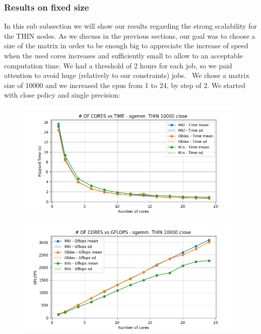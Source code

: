 \documentclass[12pt, titlepage]{report}
\begin{document}
\subsubsection{Results on fixed size}
In this sub subsection we will show our results regarding the strong scalability for the THIN nodes. As we discuss in the previous sections, our goal was to choose a size of the matrix in order to be enough big to appreciate the increase of speed when the used cores increases and sufficiently small to allow to an acceptable computation time. We had a threshold of 2 hours for each job, so we paid attention to avoid huge (relatively to our constraints) jobs. \
We chose a matrix size of 10000 and we increased the cpus from 1 to 24, by step of 2.
We started with close policy and single precision:
\begin{figure}[H]
    \centering
    \includegraphics[width=\textwidth]{THIN scalability/sgemm__THIN_10000_close_time.png}
\end{figure}

\begin{figure}[H]
    \centering
    \includegraphics[width=\textwidth]{THIN scalability/sgemm__THIN_10000_close_gflops.png}
\end{figure}
\end{document}
